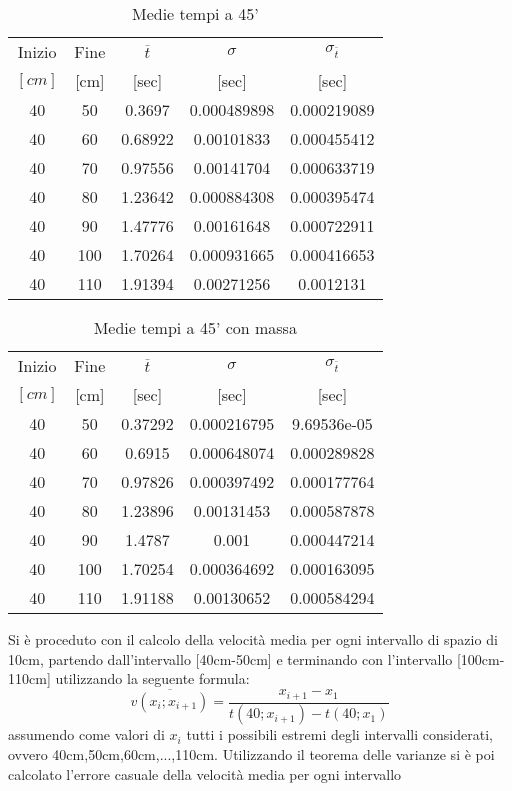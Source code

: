 \documentclass[a4paper,11pt,oneside]{article}
\begin{document}
\begin{table}[h]
\centering
\begin{tabular}{cc|ccc}
\toprule
Inizio&Fine&$\overline{t}$&$\sigma$&$\sigma_{\overline{t}}$\\
$[\si{cm}]$&[cm]&[sec]&[sec]&[sec]\\
\midrule
40 & 50  & 0.3697  & 0.000489898 & 0.000219089 \\
40 & 60  & 0.68922 & 0.00101833  & 0.000455412 \\
40 & 70  & 0.97556 & 0.00141704  & 0.000633719 \\
40 & 80  & 1.23642 & 0.000884308 & 0.000395474 \\
40 & 90  & 1.47776 & 0.00161648  & 0.000722911 \\
40 & 100 & 1.70264 & 0.000931665 & 0.000416653 \\
40 & 110 & 1.91394 & 0.00271256  & 0.0012131 \\
\bottomrule
\end{tabular}
    \caption{Medie tempi a 45'}
    \label{tab:45_primi}
\end{table}


\begin{table}[h]
\centering
\begin{tabular}{cc|ccc}
\toprule
Inizio&Fine&$\overline{t}$&$\sigma$&$\sigma_{\overline{t}}$\\
$[\si{cm}]$&[cm]&[sec]&[sec]&[sec]\\
\midrule
40 & 50  & 0.37292 & 0.000216795 & 9.69536e-05 \\
40 & 60  & 0.6915  & 0.000648074 & 0.000289828 \\
40 & 70  & 0.97826 & 0.000397492 & 0.000177764 \\
40 & 80  & 1.23896 & 0.00131453  & 0.000587878 \\
40 & 90  & 1.4787  & 0.001       & 0.000447214 \\
40 & 100 & 1.70254 & 0.000364692 & 0.000163095 \\
40 & 110 & 1.91188 & 0.00130652  & 0.000584294 \\
\bottomrule
\end{tabular}
    \caption{Medie tempi a 45' con massa}
    \label{tab:d45_primi}
\end{table}





Si è proceduto con il calcolo della velocità media per ogni intervallo di spazio di 10cm, partendo dall'intervallo [40cm-50cm] e terminando con l'intervallo [100cm-110cm] utilizzando la seguente formula:
\begin{equation*}
    \overline{v(x_i;x_{i+1})}=\frac{x_{i+1}-x_1}{t(40;x_{i+1})-t(40;x_1)}
\end{equation*}
assumendo come valori di $x_i$ tutti i possibili estremi degli intervalli considerati, ovvero 40cm,50cm,60cm,...,110cm.
Utilizzando il teorema delle varianze si è poi calcolato l'errore casuale della velocità media per ogni intervallo 
\end{document}
